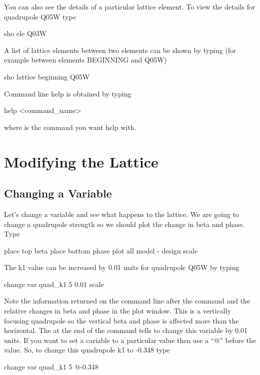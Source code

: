 \documentclass{report}
\begin{document}
You can also see the details of a particular lattice element. To view the details
for quadrupole Q05W type
\begin{example}
  sho ele Q03W
\end{example}

A list of lattice elements between two elements can be shown by typing (for
example between elements BEGINNING and Q05W)
\begin{example}
  sho lattice beginning Q05W
\end{example}

Command line help is obtained by typing
\begin{example}
  help <command\_name>
\end{example}
where  is the command you want help with.

\chapter{Modifying the Lattice}
\label{c:modify_lattice}

\section{Changing a Variable}
\label{s:put_it_back}

Let's change a variable and see what happens to the lattice. We are going to
change a quadrupole strength so we should plot the change in beta and phase.
Type
\begin{example}
  place top beta
  place bottom phase
  plot all model - design
  scale
\end{example}

The k1 value can be increased by 0.01 units for quadrupole Q05W by typing
\begin{example}
  change var quad\_k1 5 0.01
  scale
\end{example}
Note the information returned on the command line after the command and the relative changes in
beta and phase in the plot window. This is a vertically focusing quadrupole so
the vertical beta and phase is affected more than the horizontal. The 
at the end of the command tells \tao to change this variable by 0.01 units. If
you want to set a cariable to a particular value then use a ``@'' before the
value. So, to change this quadrupole k1 to -0.348 type
\begin{example}
  change var quad\_k1 5 @-0.348
\end{example}
\end{document}
